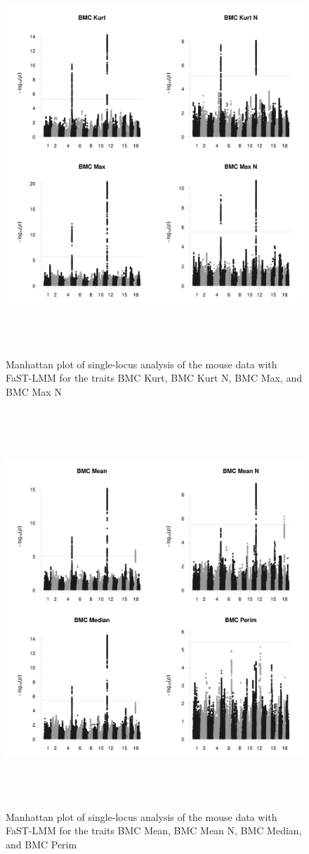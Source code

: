 \documentclass{article}
\begin{document}
\begin{figure}
\caption{Manhattan plot of single-locus analysis of the mouse data with FaST-LMM for the traits BMC Kurt,  BMC Kurt N, BMC Max, and BMC Max N}
\begin{center}
\includegraphics[width=15cm, height=15cm]{1.jpeg}
\end{center}
\end{figure}



\begin{figure}
\caption{Manhattan plot of single-locus analysis of the mouse data with FaST-LMM for the traits BMC Mean,  BMC Mean N, BMC Median, and BMC Perim}
\begin{center}
\includegraphics[width=15cm, height=15cm]{5.jpeg}
\end{center}
\end{figure}
\end{document}
